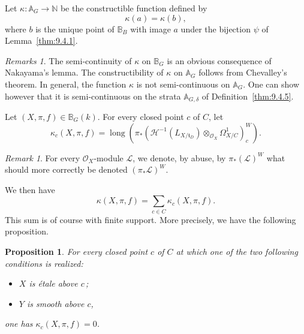 \documentclass[12pt,a4paper,oneside,english,leqno]{smfart}
\numberwithin{equation}{subsection}
\newcounter{theo}
\numberwithin{theo}{subsection}
\theoremstyle{plain}
\newtheorem{proposition}[theo]{Proposition}
\theoremstyle{definition}
\theoremstyle{remark}
\newtheorem{remark}[theo]{Remark}
\newtheorem{remarks}[theo]{Remarks}
\DeclareMathOperator{\lng}{long}
\newcommand{\NN}{\mathbb{N}}
\newcommand{\AAA}{\mathbb{A}}
\newcommand{\BBB}{\mathbb{B}}
\newcommand{\oc}{\mathcal{O}}
\newcommand{\lc}{\mathcal{L}}
\newcommand{\hc}{\mathcal{H}}
\newcommand{\tgo}{\mathfrak{t}}
\begin{document}
Let $\kappa:\AAA_G\to\NN$ be the constructible function defined by
\[
\kappa(a)=\kappa(b),
\]
where $b$ is the unique point of $\BBB_B$ with image $a$ under the bijection $\psi$ of Lemma~\ref{thm:9.4.1}.

\begin{remarks}\label{thm:9.7.2}
The semi-continuity of $\kappa$ on $\BBB_G$ is an obvious consequence of Nakayama's lemma. The constructibility of $\kappa$ on $\AAA_G$ follows from Chevalley's theorem. In general, the function $\kappa$ is not semi-continuous on $\AAA_G$. One can show however that it is semi-continuous on the strata $\AAA_{G,\delta}$ of Definition~\ref{thm:9.4.5}.
\end{remarks}

Let $(X,\pi,f)\in\BBB_G(k)$. For every closed point $c$ of $C$, let
\begin{equation}\label{eq:9.7.1}
\kappa_c(X,\pi,f)=\lng(\pi_*(\hc^{-1}(L_{X/\tgo_D})\otimes_{\oc_X}\Omega^1_{X/C})^W_c).
\end{equation}

\begin{remark}\label{thm:9.7.3}
For every $\oc_X$-module $\lc$, we denote, by abuse, by $\pi_*(\lc)^W$ what should more correctly be denoted $(\pi_*\lc)^W$.
\end{remark}

We then have
\begin{equation}\label{eq:9.7.2}
\kappa(X,\pi,f)=\sum_{c\in C}\kappa_c(X,\pi,f).
\end{equation}
This sum is of course with finite support. More precisely, we have the following proposition.

\begin{proposition}\label{thm:9.7.4}
For every closed point $c$ of $C$ at which one of the two following conditions is realized:
\begin{itemize}
\item[--] $X$ is étale above $c$\,; \item[--] $Y$ is smooth above $c$,
\end{itemize}
one has $\kappa_c(X,\pi,f)=0$.
\end{proposition}
\end{document}
